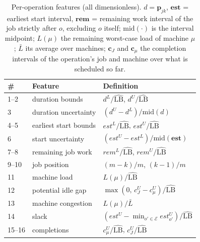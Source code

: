 \documentclass[preprint,authoryear,12pt]{elsarticle}
\newcommand{\LBi}{\widehat{\mathrm{LB}}}
\theoremstyle{definition}
\theoremstyle{remark}
\begin{document}
\begin{table}[!htb]
\centering\small
\caption{Per-operation features (all dimensionless). $d=\mathbf{p}_{jk}$,
$\mathbf{est}$ = earliest start interval, $\mathbf{rem}$ = remaining work
interval of the job strictly after $o$, excluding $o$ itself;
$\mathrm{mid}(\cdot)$ is the interval
midpoint; $L(\mu)$ the remaining worst-case load of machine $\mu$;
$\bar L$ its average over machines; $\mathbf{c}_{J}$ and
$\mathbf{c}_{\mu}$ the completion intervals of the operation's job
and machine over what is scheduled so far.}
\label{tab:opfeatures}
\begin{tabular*}{\textwidth}{@{\extracolsep{\fill}}lll}
\toprule
\# & Feature & Definition \\
\midrule
1--2 & duration bounds & $d^L/\LBi$, $d^U/\LBi$ \\
3 & duration uncertainty & $(d^U-d^L)/\mathrm{mid}(d)$ \\
4--5 & earliest start bounds & $est^L/\LBi$, $est^U/\LBi$ \\
6 & start uncertainty & $(est^U-est^L)/\mathrm{mid}(\mathbf{est})$ \\
7--8 & remaining job work & $rem^L/\LBi$, $rem^U/\LBi$ \\
9--10 & job position & $(m-k)/m$, $(k-1)/m$ \\
11 & machine load & $L(\mu)/\LBi$ \\
12 & potential idle gap & $\max(0,\,c^U_{J}-c^U_{\mu})/\LBi$ \\
13 & machine congestion & $L(\mu)/\bar L$ \\
14 & slack & $(est^U-\min_{o'\in\mathcal{E}}est^U_{o'})/\LBi$ \\
15--16 & completions & $c^U_{\mu}/\LBi$, $c^U_{J}/\LBi$ \\
\bottomrule
\end{tabular*}
\end{table}
\end{document}
